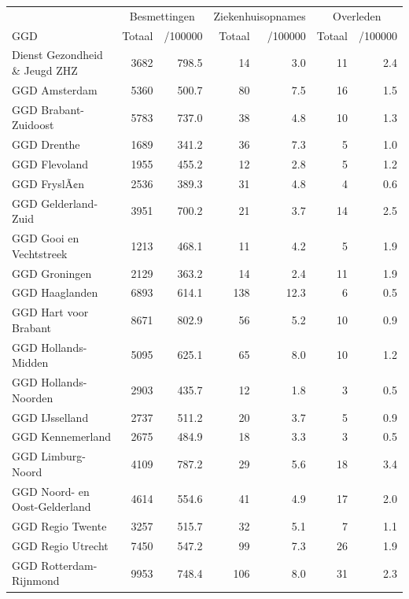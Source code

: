 \documentclass[
  english,
  man,floatsintext]{apa6}
\begin{document}
\begin{table}
\centering\begingroup\fontsize{10}{12}\selectfont

\begin{threeparttable}
\begin{tabular}{lrrrrrr}
\toprule
\multicolumn{1}{c}{ } & \multicolumn{2}{c}{Besmettingen} & \multicolumn{2}{c}{Ziekenhuisopnames} & \multicolumn{2}{c}{Overleden} \\
\cmidrule(l{3pt}r{3pt}){2-3} \cmidrule(l{3pt}r{3pt}){4-5} \cmidrule(l{3pt}r{3pt}){6-7}
GGD & Totaal & /100000 & Totaal & /100000 & Totaal & /100000\\
\midrule
Dienst Gezondheid \& Jeugd ZHZ & 3682 & 798.5 & 14 & 3.0 & 11 & 2.4\\
GGD Amsterdam & 5360 & 500.7 & 80 & 7.5 & 16 & 1.5\\
GGD Brabant-Zuidoost & 5783 & 737.0 & 38 & 4.8 & 10 & 1.3\\
GGD Drenthe & 1689 & 341.2 & 36 & 7.3 & 5 & 1.0\\
GGD Flevoland & 1955 & 455.2 & 12 & 2.8 & 5 & 1.2\\
GGD FryslÃ¢n & 2536 & 389.3 & 31 & 4.8 & 4 & 0.6\\
GGD Gelderland-Zuid & 3951 & 700.2 & 21 & 3.7 & 14 & 2.5\\
GGD Gooi en Vechtstreek & 1213 & 468.1 & 11 & 4.2 & 5 & 1.9\\
GGD Groningen & 2129 & 363.2 & 14 & 2.4 & 11 & 1.9\\
GGD Haaglanden & 6893 & 614.1 & 138 & 12.3 & 6 & 0.5\\
GGD Hart voor Brabant & 8671 & 802.9 & 56 & 5.2 & 10 & 0.9\\
GGD Hollands-Midden & 5095 & 625.1 & 65 & 8.0 & 10 & 1.2\\
GGD Hollands-Noorden & 2903 & 435.7 & 12 & 1.8 & 3 & 0.5\\
GGD IJsselland & 2737 & 511.2 & 20 & 3.7 & 5 & 0.9\\
GGD Kennemerland & 2675 & 484.9 & 18 & 3.3 & 3 & 0.5\\
GGD Limburg-Noord & 4109 & 787.2 & 29 & 5.6 & 18 & 3.4\\
GGD Noord- en Oost-Gelderland & 4614 & 554.6 & 41 & 4.9 & 17 & 2.0\\
GGD Regio Twente & 3257 & 515.7 & 32 & 5.1 & 7 & 1.1\\
GGD Regio Utrecht & 7450 & 547.2 & 99 & 7.3 & 26 & 1.9\\
GGD Rotterdam-Rijnmond & 9953 & 748.4 & 106 & 8.0 & 31 & 2.3\\

\end{tabular}
\end{threeparttable}
\end{table}
\end{document}
